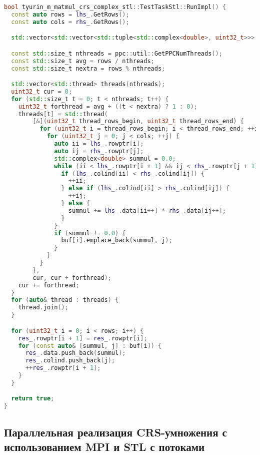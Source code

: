 \documentclass[a4paper,12pt]{article}
\begin{document}
\begin{lstlisting}[language=C++,caption={CRS-умножение матриц с использованием стандартных потоков STL}]
bool tyurin_m_matmul_crs_complex_stl::TestTaskStl::RunImpl() {
  const auto rows = lhs_.GetRows();
  const auto cols = rhs_.GetRows();

  std::vector<std::vector<std::tuple<std::complex<double>, uint32_t>>> buf(rows);

  const std::size_t nthreads = ppc::util::GetPPCNumThreads();
  const std::size_t avg = rows / nthreads;
  const std::size_t nextra = rows % nthreads;

  std::vector<std::thread> threads(nthreads);
  uint32_t cur = 0;
  for (std::size_t t = 0; t < nthreads; t++) {
    uint32_t forthread = avg + ((t < nextra) ? 1 : 0);
    threads[t] = std::thread(
        [&](uint32_t thread_rows_begin, uint32_t thread_rows_end) {
          for (uint32_t i = thread_rows_begin; i < thread_rows_end; ++i) {
            for (uint32_t j = 0; j < cols; ++j) {
              auto ii = lhs_.rowptr[i];
              auto ij = rhs_.rowptr[j];
              std::complex<double> summul = 0.0;
              while (ii < lhs_.rowptr[i + 1] && ij < rhs_.rowptr[j + 1]) {
                if (lhs_.colind[ii] < rhs_.colind[ij]) {
                  ++ii;
                } else if (lhs_.colind[ii] > rhs_.colind[ij]) {
                  ++ij;
                } else {
                  summul += lhs_.data[ii++] * rhs_.data[ij++];
                }
              }
              if (summul != 0.0) {
                buf[i].emplace_back(summul, j);
              }
            }
          }
        },
        cur, cur + forthread);
    cur += forthread;
  }
  for (auto& thread : threads) {
    thread.join();
  }

  for (uint32_t i = 0; i < rows; i++) {
    res_.rowptr[i + 1] = res_.rowptr[i];
    for (const auto& [summul, j] : buf[i]) {
      res_.data.push_back(summul);
      res_.colind.push_back(j);
      ++res_.rowptr[i + 1];
    }
  }

  return true;
}
\end{lstlisting}

\subsection{Параллельная реализация CRS-умножения с использованием MPI и STL с потоками}
\end{document}
